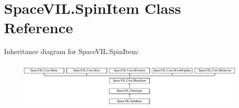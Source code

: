 \hypertarget{class_space_v_i_l_1_1_spin_item}{}\section{Space\+V\+I\+L.\+Spin\+Item Class Reference}
\label{class_space_v_i_l_1_1_spin_item}
Inheritance diagram for Space\+V\+I\+L.\+Spin\+Item\+:\begin{figure}[H]
\begin{center}
\leavevmode
\includegraphics[height=2.421622cm]{class_space_v_i_l_1_1_spin_item}
\end{center}
\end{figure}
